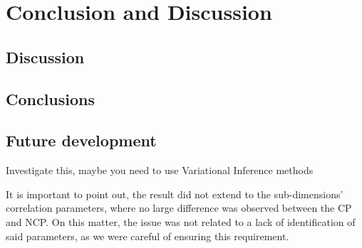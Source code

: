 \chapter{Conclusion and Discussion} \label{cap:conclusions}

\section{Discussion}

\section{Conclusions}

\section{Future development}

Investigate this, maybe you need to use Variational Inference methods

It is important to point out, the result did not extend to the sub-dimensions' correlation parameters, where no large difference was observed between the CP and NCP. On this matter, the issue was not related to a lack of identification of said parameters, as we were careful of ensuring this requirement.